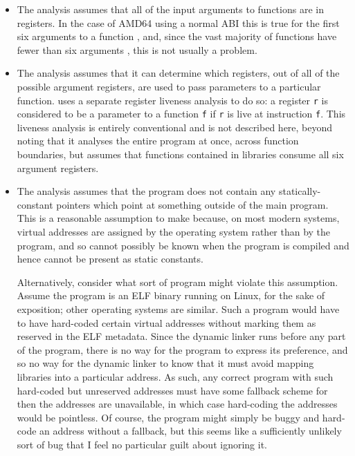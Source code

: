 \begin{itemize}
\item
  The analysis assumes that all of the input arguments to functions
  are in registers.  In the case of AMD64 using a normal ABI this is
  true for the first six arguments to a function \needCite{}, and,
  since the vast majority of functions have fewer than six arguments
  \needCite{}, this is not usually a problem.  

\item
  The analysis assumes that it can determine which registers, out of
  all of the possible argument registers, are used to pass parameters
  to a particular function.  {\Implementation} uses a separate
  register liveness analysis to do so: a register \verb|r| is
  considered to be a parameter to a function \verb|f| if \verb|r| is
  live at instruction \verb|f|.  This liveness analysis is entirely
  conventional and is not described here, beyond noting that it
  analyses the entire program at once, across function boundaries, but
  assumes that functions contained in libraries consume all six
  argument registers.

\item
  The analysis assumes that the program does not contain any
  statically-constant pointers which point at something outside of the
  main program.  This is a reasonable assumption to make because, on
  most modern systems, virtual addresses are assigned by the operating
  system rather than by the program, and so cannot possibly be known
  when the program is compiled and hence cannot be present as static
  constants.

  Alternatively, consider what sort of program might violate this
  assumption.  Assume the program is an ELF binary running on Linux,
  for the sake of exposition; other operating systems are similar.
  Such a program would have to have hard-coded certain virtual
  addresses without marking them as reserved in the ELF metadata.
  Since the dynamic linker runs before any part of the program, there
  is no way for the program to express its preference, and so no way
  for the dynamic linker to know that it must avoid mapping libraries
  into a particular address.  As such, any correct program with such
  hard-coded but unreserved addresses must have some fallback scheme
  for then the addresses are unavailable, in which case hard-coding
  the addresses would be pointless.  Of course, the program might
  simply be buggy and hard-code an address without a fallback, but
  this seems like a sufficiently unlikely sort of bug that I feel no
  particular guilt about ignoring it.  


\end{itemize}
